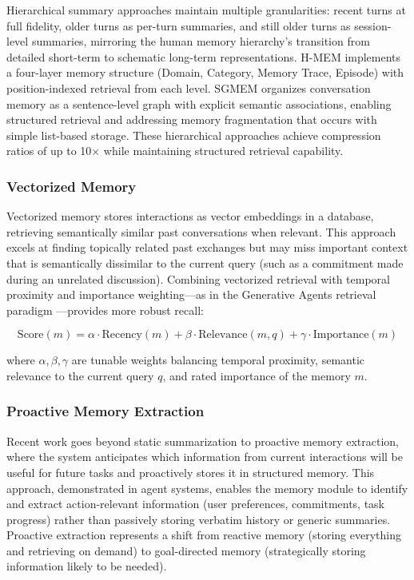 \documentclass[11pt,letterpaper]{article}
\begin{document}
Hierarchical summary approaches maintain multiple granularities: recent turns at full fidelity, older turns as per-turn summaries, and still older turns as session-level summaries, mirroring the human memory hierarchy's transition from detailed short-term to schematic long-term representations. H-MEM implements a four-layer memory structure (Domain, Category, Memory Trace, Episode) with position-indexed retrieval from each level. SGMEM organizes conversation memory as a sentence-level graph with explicit semantic associations, enabling structured retrieval and addressing memory fragmentation that occurs with simple list-based storage. These hierarchical approaches achieve compression ratios of up to 10$\times$ while maintaining structured retrieval capability.

\subsubsection{Vectorized Memory}

Vectorized memory stores interactions as vector embeddings in a database, retrieving semantically similar past conversations when relevant. This approach excels at finding topically related past exchanges but may miss important context that is semantically dissimilar to the current query (such as a commitment made during an unrelated discussion). Combining vectorized retrieval with temporal proximity and importance weighting---as in the Generative Agents retrieval paradigm \cite{park2023generative}---provides more robust recall:

\begin{equation}
\text{Score}(m) = \alpha \cdot \text{Recency}(m) + \beta \cdot \text{Relevance}(m, q) + \gamma \cdot \text{Importance}(m)
\end{equation}

where $\alpha, \beta, \gamma$ are tunable weights balancing temporal proximity, semantic relevance to the current query $q$, and rated importance of the memory $m$.

\subsubsection{Proactive Memory Extraction}

Recent work goes beyond static summarization to proactive memory extraction, where the system anticipates which information from current interactions will be useful for future tasks and proactively stores it in structured memory. This approach, demonstrated in agent systems, enables the memory module to identify and extract action-relevant information (user preferences, commitments, task progress) rather than passively storing verbatim history or generic summaries. Proactive extraction represents a shift from reactive memory (storing everything and retrieving on demand) to goal-directed memory (strategically storing information likely to be needed).
\end{document}
